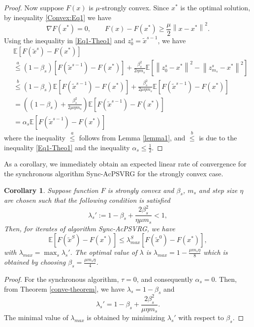 \documentclass{article}
\newcommand*{\E}{\mathbb{E}}
\newcommand{\norm}[1]{\left\lVert#1\right\rVert}
\newtheorem{corollary}[theorem]{Corollary}
\theoremstyle{definition}
\theoremstyle{remark}
\begin{document}
\begin{proof}
Now suppose $F(x)$ is $\mu$-strongly convex. Since $x^*$ is the optimal solution, by inequality \eqref{Convex:Eq1} we have 
\begin{equation}\label{Eq1-Theo1}
\nabla F(x^*) = 0,\qquad F(x)-F(x^*) \geq \frac{\mu}{2} \norm{x-x^*}^2.
\end{equation}
Using the inequality in \eqref{Eq1-Theo1} and $z_0^s = \widetilde{x}^{s-1}$, we have 
\begin{equation}
\begin{split}
&\E[F(\widetilde{x}^s)-F(x^*)]\\
& \stackrel{a}{\leq} (1-\beta_s)[F(\widetilde{x}^{s-1})-F(x^*)]+ {\frac{ \beta_s^2}{2\eta m_s}}\E[\norm{z_{0}^s-x^*}^2-\norm{z_{m_s}^s-x^*}^2]\\
&\stackrel{b}{\leq}(1-\beta_s)\E[F(\widetilde{x}^{s-1})-F(x^*)]+ {\frac{\beta_s^2}{2\mu\eta m_s}}\E[F(\widetilde{x}^{s-1})-F(x^*)]\\
&=((1-\beta_s)+{\frac{  \beta_s^2}{2\mu\eta m_s}})\E[F(\widetilde{x}^{s-1})-F(x^*)]\\
&=\alpha_s\E[F(\widetilde{x}^{s-1})-F(x^*)]
\end{split}
\end{equation}
where the inequality $\stackrel{a}{\leq}$ follows from Lemma \ref{lemma1}, and $\stackrel{b}{\leq}$ is due to the inequality \eqref{Eq1-Theo1} and the inequality $\alpha_s\leq \frac{1}{2}$. 
\end{proof}
As a corollary, we immediately obtain an expected linear rate of convergence for the synchronous algorithm Sync-AcPSVRG for the strongly convex case.
\begin{corollary}\label{cor-syn}
Suppose function $F$ is strongly convex and $\beta_s$, $m_s$ and step size $\eta$ are chosen
such that the following condition is satisfied
\[
\lambda_s' := 1-\beta_s+{\frac{2\beta_s^2}{\eta\mu m_s}} < 1,
\]
Then, for iterates of algorithm Sync-AcPSVRG, we have
\begin{equation}
\E\left[F(\widetilde{x}^S)-F(x^*)\right]\leq \lambda_{max}^S\left[F(\widetilde{x}^0)-F(x^*)\right], 
\end{equation}
with $\lambda_{max} = \max_{s}{\lambda_s'}$. The optimal value of $\lambda$ is $\lambda_{max} = 1-\frac{\mu m_s\eta}{8}$ which is obtained by choosing ${\beta_s=\frac{\mu m_s\eta}{4}}$.
\end{corollary}
\begin{proof}
For the synchronous algorithm, $\tau=0$, and consequently $\alpha_s=0$. Then, from Theorem \ref{conve-theorem}, we have $\lambda_s = 1-\beta_s$ and 
\[
\lambda_s' = 1-\beta_s+{\frac{2  \beta_s^2}{\mu\eta m_s}}.\]
The minimal value of $\lambda_{max}$ is obtained by minimizing $\lambda_s'$ with respect to $\beta_s$.
\end{proof}
\end{document}
